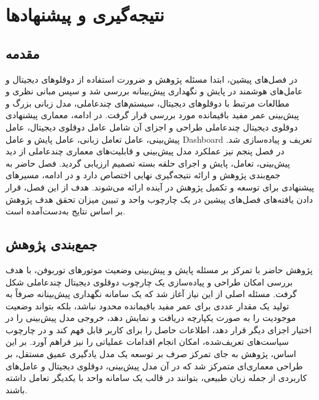 \chapter{نتیجه‌گیری و پیشنهادها}
\label{chap:conclusion}

\section{مقدمه}
\label{sec}
در فصل‌های پیشین، ابتدا مسئله پژوهش و ضرورت استفاده از دوقلوهای دیجیتال و عامل‌های هوشمند در پایش و نگهداری پیش‌بینانه بررسی شد و سپس مبانی نظری و مطالعات مرتبط با دوقلوهای دیجیتال، سیستم‌های چندعاملی، مدل زبانی بزرگ و پیش‌بینی عمر مفید باقیمانده مورد بررسی قرار گرفت. در ادامه، معماری پیشنهادی دوقلوی دیجیتال چندعاملی طراحی و اجزای آن شامل عامل دوقلوی دیجیتال، عامل پیش‌بینی، عامل تعامل زبانی، عامل پایش و عامل \gls{Dashboard} تعریف و پیاده‌سازی شد. در فصل پنجم نیز عملکرد مدل پیش‌بینی و قابلیت‌های معماری چندعاملی از دید پیش‌بینی، تعامل، پایش و اجرای حلقه بسته تصمیم ارزیابی گردید. فصل حاضر به جمع‌بندی پژوهش و ارائه نتیجه‌گیری نهایی اختصاص دارد و در ادامه، مسیرهای پیشنهادی برای توسعه و تکمیل پژوهش در آینده ارائه می‌شوند. هدف از این فصل، قرار دادن یافته‌های فصل‌های پیشین در یک چارچوب واحد و تبیین میزان تحقق هدف پژوهش بر اساس نتایج به‌دست‌آمده است.

\section{جمع‌بندی پژوهش}
\label{sec:research-summary}
پژوهش حاضر با تمرکز بر مسئله پایش و پیش‌بینی وضعیت موتورهای توربوفن، با هدف بررسی امکان طراحی و پیاده‌سازی یک چارچوب دوقلوی دیجیتال چندعاملی شکل گرفت. مسئله اصلی از این نیاز آغاز شد که یک سامانه نگهداری پیش‌بینانه صرفاً به تولید یک مقدار عددی برای عمر مفید باقیمانده محدود نباشد، بلکه بتواند وضعیت موجودیت را به صورت یکپارچه دریافت و نمایش دهد، خروجی مدل پیش‌بینی را در اختیار اجزای دیگر قرار دهد، اطلاعات حاصل را برای کاربر قابل فهم کند و در چارچوب سیاست‌های تعریف‌شده، امکان انجام اقدامات عملیاتی را نیز فراهم آورد. بر این اساس، پژوهش به جای تمرکز صرف بر توسعه یک مدل یادگیری عمیق مستقل، بر طراحی معماری‌ای متمرکز شد که در آن مدل پیش‌بینی، دوقلوی دیجیتال و عامل‌های کاربردی از جمله زبان طبیعی، بتوانند در قالب یک سامانه واحد با یکدیگر تعامل داشته باشند.

